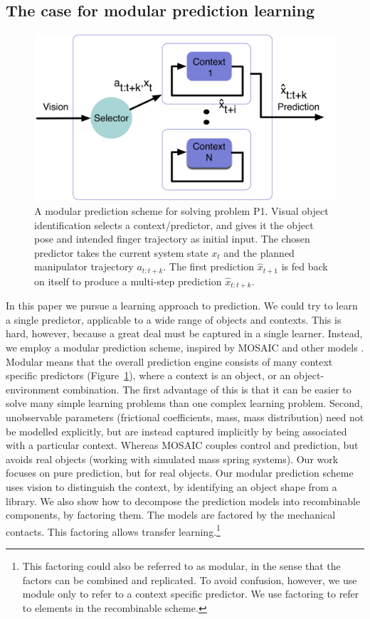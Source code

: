 \subsection{The case for modular prediction learning}
\begin{figure}[t]
\centerline{\includegraphics[width=0.9\columnwidth]{modular-schema}}
\caption{A modular prediction scheme for solving problem P1. Visual object identification selects a context/predictor, and gives it the object pose and intended finger trajectory as initial input. The chosen predictor takes the current system state $x_t$ and the planned manipulator trajectory $a_{t:t+k}$. The first prediction $\hat{x}_{t+1}$ is fed back on itself to produce a multi-step prediction $\hat{x}_{t:t+k}$. \label{fig:modular-simple}}
\end{figure}
In this paper we pursue a learning approach to prediction. We could try to learn a single predictor, applicable to a wide range of objects and contexts. This is hard, however, because a great deal must be captured in a single learner. Instead, we employ a modular prediction scheme, inspired by MOSAIC \citep{Haruno_MOSAIC_2008} and other models \citep{demiris2003distributed}. Modular means that the overall prediction engine consists of many context specific predictors (Figure~\ref{fig:modular-simple}), where a context is an object, or an object-environment combination. The first advantage of this is that it can be easier to solve many simple learning problems than one complex learning problem. Second, unobservable parameters (frictional coefficients, mass, mass distribution) need not be modelled explicitly, but are instead captured implicitly by being associated with a particular context. Whereas MOSAIC couples control and prediction, but avoids real objects (working with simulated mass spring systems). Our work focuses on pure prediction, but for real objects. Our modular prediction scheme uses vision to distinguish the context, by identifying an object shape from a library. We also show how to decompose the prediction models into recombinable components, by factoring them. The models are factored by the mechanical contacts. This factoring allows transfer learning.\footnote{This factoring could also be referred to as modular, in the sense that the factors can be combined and replicated. To avoid confusion, however, we use module only to refer to a context specific predictor. We use factoring to refer to elements in the recombinable scheme.}
